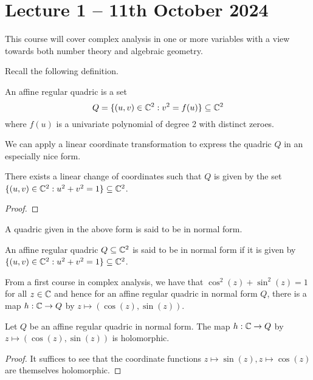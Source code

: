 \section{Lecture 1 -- 11th October 2024}\label{sec: lecture 1}
This course will cover complex analysis in one or more variables with a view towards both number theory and algebraic geometry. 

Recall the following definition. 
\begin{definition}\label{def: affine regular quadric}
    An affine regular quadric is a set  
    $$Q=\{(u,v)\in\mathbb{C}^{2}:v^{2}=f(u)\}\subseteq\mathbb{C}^{2}$$
    where $f(u)$ is a univariate polynomial of degree 2 with distinct zeroes.
\end{definition}
We can apply a linear coordinate transformation to express the quadric $Q$ in an especially nice form. 
\begin{proposition}\label{prop: existence of canonical form}
    There exists a linear change of coordinates such that $Q$ is given by the set $\{(u,v)\in\mathbb{C}^{2}:u^{2}+v^{2}=1\}\subseteq\mathbb{C}^{2}$.
\end{proposition}
\begin{proof}
\end{proof}
A quadric given in the above form is said to be in normal form. 
\begin{definition}\label{def: normal form quadric}
    An affine regular quadric $Q\subseteq\mathbb{C}^{2}$ is said to be in normal form if it is given by $\{(u,v)\in\mathbb{C}^{2}:u^{2}+v^{2}=1\}\subseteq\mathbb{C}^{2}$.
\end{definition}
From a first course in complex analysis, we have that $\cos^{2}(z)+\sin^{2}(z)=1$ for all $z\in\mathbb{C}$ and hence for an affine regular quadric in normal form $Q$, there is a map $h:\mathbb{C}\to Q$ by $z\mapsto(\cos(z),\sin(z))$. 
\begin{proposition}\label{prop: holomorphic parameterization}
    Let $Q$ be an affine regular quadric in normal form. The map $h:\mathbb{C}\to Q$ by $z\mapsto(\cos(z),\sin(z))$ is holomorphic. 
\end{proposition}
\begin{proof}
    It suffices to see that the coordinate functions $z\mapsto\sin(z), z\mapsto\cos(z)$ are themselves holomorphic.
\end{proof}
